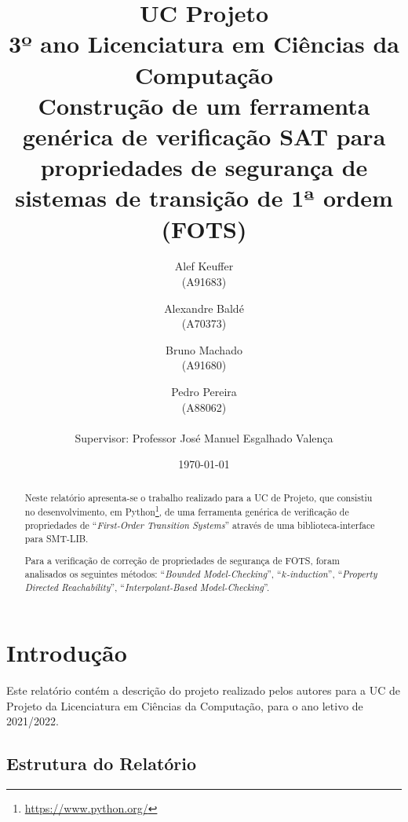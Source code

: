 \documentclass[11pt,a4paper]{report}%
\title{UC Projeto\\
      3º ano Licenciatura em Ciências da Computação \\
      Construção de um ferramenta genérica de verificação SAT para propriedades de segurança de sistemas de transição de 1ª ordem (FOTS)
      } %
\author{Alef Keuffer\\ (A91683) \and Alexandre Baldé\\ (A70373)
         \and Bruno Machado\\ (A91680) \and Pedro Pereira\\ (A88062) \\ \\
        Supervisor: Professor José Manuel Esgalhado Valença
       } %
\date{\today} %
\def\pdr{``\textit{Property Directed Reachability}''\xspace}
\def\bmc{``\textit{Bounded Model-Checking}''\xspace}
\def\imc{``\textit{Interpolant-Based Model-Checking}''\xspace}
\def\fotss{``\textit{First-Order Transition Systems}''\xspace}
\def\kind{``\textit{$k$-induction}''\xspace}
\begin{document}
\maketitle %

\begin{abstract}  %
Neste relatório apresenta-se o trabalho realizado para a UC de Projeto, que
consistiu no desenvolvimento, em Python\footnote{\url{https://www.python.org/}}, de uma ferramenta genérica de verificação de
propriedades de \fotss através de uma biblioteca-interface para SMT-LIB.

Para a verificação de correção de propriedades de segurança de FOTS,
foram analisados os seguintes métodos: \bmc, \kind, \pdr, \imc.
\end{abstract}

\tableofcontents %
\listoffigures %
\renewcommand\listoflistingscaption{Lista de excertos de código}
\listoflistings

\chapter{Introdução} \label{chap:intro} %

Este relatório contém a descrição do projeto realizado pelos autores para a
UC de Projeto da Licenciatura em Ciências da Computação, para o ano letivo de 2021/2022.

\section{Estrutura do Relatório}
\end{document}
